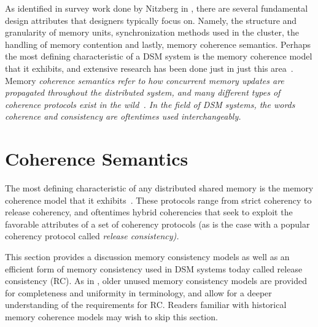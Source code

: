 \documentclass[10pt,conference]{IEEEtran}
\begin{document}
As identified in survey work done by Nitzberg in \cite{Nitzberg:1991:DSM:112827.112855}, there are several fundamental design attributes that designers typically focus on.  Namely, the structure and granularity of memory units, synchronization methods used in the cluster, the handling of memory contention and lastly, memory coherence semantics.  Perhaps the most defining characteristic of a DSM system is the memory coherence model that it exhibits, and extensive research has been done just in just this area~\cite{Steinke:2004:UTS:1017460.1017464}.  Memory \em coherence semantics \em refer to how concurrent memory updates are propagated throughout the distributed system, and many different types of coherence protocols exist in the wild~\cite{Nitzberg:1991:DSM:112827.112855}.  In the field of DSM systems, the words \em coherence \em and \em consistency \em are oftentimes used interchangeably.


\section{Coherence Semantics}

The most defining characteristic of any distributed shared memory is the memory coherence model that it exhibits~\cite{Steinke:2004:UTS:1017460.1017464}.  These protocols range from strict coherency to release coherency, and oftentimes hybrid coherencies that seek to exploit the favorable attributes of a set of coherency protocols (as is the case with a popular coherency protocol called \em release consistency\em).  

This section provides a discussion memory consistency models as well as an efficient form of memory consistency used in DSM systems today called release consistency (RC).  As in \cite{Gharachorloo:1990:MCE:325164.325102}, older unused memory consistency models are provided for completeness and uniformity in terminology, and allow for a deeper understanding of the requirements for RC.  Readers familiar with historical memory coherence models may wish to skip this section.
\end{document}
